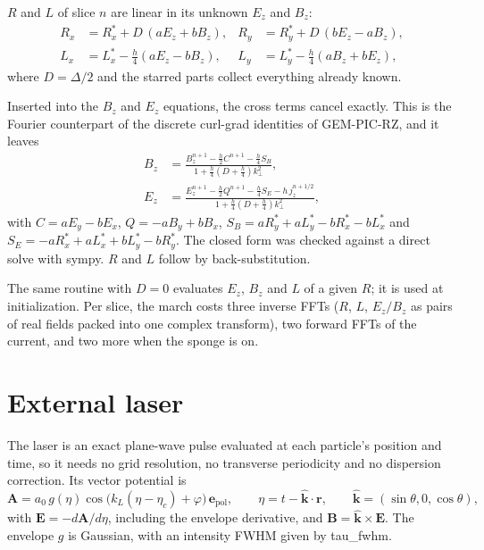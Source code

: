 \documentclass[11pt,a4paper]{article}
\newcommand{\code}[1]{{\fontencoding{OT1}\fontfamily{cmtt}\selectfont #1}}
\newcommand{\kperp}{k_\perp}
\newcommand{\khat}{\hat{\bm k}}
\begin{document}
$R$ and $L$ of slice $n$ are linear in its unknown $E_z$ and $B_z$:
\begin{equation}
\begin{aligned}
R_x &= R^*_x + D\,(a E_z + b B_z), & R_y &= R^*_y + D\,(b E_z - a B_z),\\
L_x &= L^*_x - \tfrac{h}{4}(a E_z - b B_z), & L_y &= L^*_y - \tfrac{h}{4}(a B_z + b E_z),
\end{aligned}
\end{equation}
where $D=\Delta/2$ and the starred parts collect everything already known.

Inserted into the $B_z$ and $E_z$ equations, the cross terms cancel exactly. This is the Fourier counterpart of the discrete curl-grad identities of GEM-PIC-RZ, and it leaves
\begin{equation}
\begin{aligned}
B_z &= \frac{B_z^{n+1} - \tfrac{h}{2} C^{n+1} - \tfrac{h}{4} S_B}{1 + \tfrac{h}{4}\left(D + \tfrac{h}{4}\right) \kperp^2},\\[1ex]
E_z &= \frac{E_z^{n+1} - \tfrac{h}{2} Q^{n+1} - \tfrac{h}{4} S_E - h\, j_z^{n+1/2}}{1 + \tfrac{h}{4}\left(D + \tfrac{h}{4}\right) \kperp^2},
\end{aligned}
\label{eq:closed}
\end{equation}
with $C=aE_y-bE_x$, $Q=-aB_y+bB_x$, $S_B=aR^*_y+aL^*_y-bR^*_x-bL^*_x$ and $S_E=-aR^*_x+aL^*_x+bL^*_y-bR^*_y$. The closed form was checked against a direct solve with sympy. $R$ and $L$ follow by back-substitution.

The same routine with $D=0$ evaluates $E_z$, $B_z$ and $L$ of a given $R$; it is used at initialization. Per slice, the march costs three inverse FFTs ($R$, $L$, $E_z/B_z$ as pairs of real fields packed into one complex transform), two forward FFTs of the current, and two more when the sponge is on.

\section{External laser}

The laser is an exact plane-wave pulse evaluated at each particle's position and time, so it needs no grid resolution, no transverse periodicity and no dispersion correction. Its vector potential is
\begin{equation}
\bm A = a_0\, g(\eta)\cos\!\big(k_L(\eta-\eta_c)+\varphi\big)\,\bm e_{\mathrm{pol}},\qquad \eta=t-\khat\cdot\bm r,\qquad \khat=(\sin\theta,0,\cos\theta),
\end{equation}
with $\bm E=-d\bm A/d\eta$, including the envelope derivative, and $\bm B=\khat\times\bm E$. The envelope $g$ is Gaussian, with an intensity FWHM given by \code{tau\_fwhm}.
\end{document}
